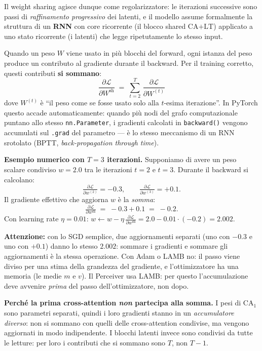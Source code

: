\documentclass[
  11pt,
]{article}
\begin{document}
Il weight sharing agisce dunque come regolarizzatore: le iterazioni successive sono passi di \emph{raffinamento progressivo} dei latenti, e il modello assume formalmente la struttura di un \textbf{RNN} con core ricorrente (il blocco shared $\text{CA+LT}$) applicato a uno stato ricorrente (i latenti) che legge ripetutamente lo stesso input.

\begin{notabox}[title={\textbf{Come si comporta il weight sharing nel backward pass}}]
Quando un peso $W$ viene usato in più blocchi del forward, ogni istanza del peso produce un contributo al gradiente durante il backward. Per il training corretto, questi contributi \textbf{si sommano}:
\[
\boxed{\;\frac{\partial \mathcal{L}}{\partial W^{\text{sh}}} \;=\; \sum_{t = 2}^{T}\,\frac{\partial \mathcal{L}}{\partial W^{(t)}}\;}
\]
dove $W^{(t)}$ è ``il peso come se fosse usato solo alla $t$-esima iterazione''. In PyTorch questo accade automaticamente: quando più nodi del grafo computazionale puntano allo stesso \texttt{nn.Parameter}, i gradienti calcolati in \texttt{backward()} vengono accumulati sul \texttt{.grad} del parametro --- è lo stesso meccanismo di un RNN srotolato (BPTT, \emph{back-propagation through time}).

\medskip
\textbf{Esempio numerico con $T=3$ iterazioni.} Supponiamo di avere un peso scalare condiviso $w = 2.0$ tra le iterazioni $t=2$ e $t=3$. Durante il backward si calcolano:
\[
\tfrac{\partial\mathcal{L}}{\partial w^{(2)}} = -0.3, \qquad \tfrac{\partial\mathcal{L}}{\partial w^{(3)}} = +0.1.
\]
Il gradiente effettivo che aggiorna $w$ è la \emph{somma}:
\[
\tfrac{\partial\mathcal{L}}{\partial w^{\text{sh}}} \;=\; -0.3 + 0.1 \;=\; -0.2.
\]
Con learning rate $\eta = 0.01$: $w \leftarrow w - \eta\, \tfrac{\partial\mathcal{L}}{\partial w^{\text{sh}}} = 2.0 - 0.01\cdot(-0.2) = 2.002$.

\medskip
\textbf{Attenzione:} con lo SGD semplice, due aggiornamenti separati (uno con $-0.3$ e uno con $+0.1$) danno lo stesso $2.002$: sommare i gradienti e sommare gli aggiornamenti è la stessa operazione. Con Adam o LAMB no: il passo viene diviso per una stima della grandezza del gradiente, e l'ottimizzatore ha una memoria (le medie $m$ e $v$). Il Perceiver usa LAMB: per questo l'accumulazione deve avvenire \emph{prima} del passo dell'ottimizzatore, non dopo.

\medskip
\textbf{Perché la prima cross-attention \emph{non} partecipa alla somma.} I pesi di $\text{CA}_1$ sono parametri separati, quindi i loro gradienti stanno in un \emph{accumulatore diverso}: non si sommano con quelli delle cross-attention condivise, ma vengono aggiornati in modo indipendente. I blocchi latenti invece sono condivisi da tutte le letture: per loro i contributi che si sommano sono $T$, non $T-1$.
\end{notabox}
\end{document}
